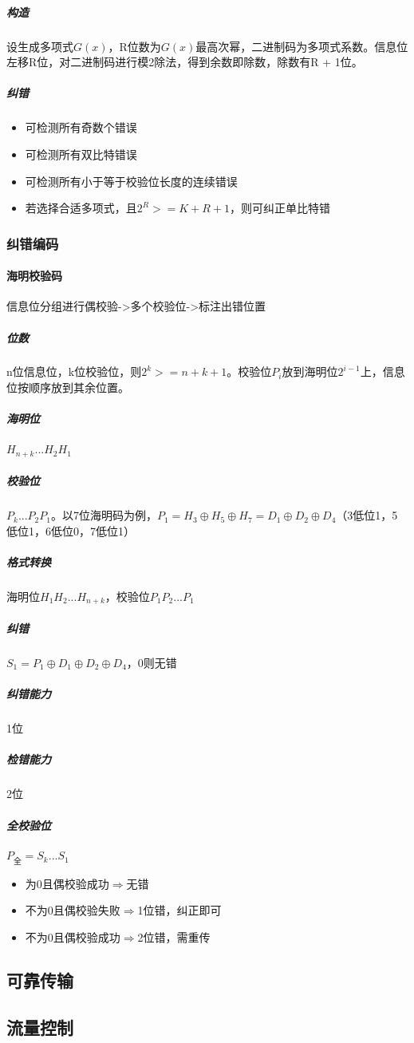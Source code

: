 \subparagraph{构造}
设生成多项式\(G(x)\)，R位数为\(G(x)\)最高次幂，二进制码为多项式系数。信息位左移R位，对二进制码进行模2除法，得到余数即除数，除数有R + 1位。

\subparagraph{纠错}
\begin{itemize}
    \item 可检测所有奇数个错误
    \item 可检测所有双比特错误
    \item 可检测所有小于等于校验位长度的连续错误
    \item 若选择合适多项式，且\(2^R >= K + R + 1\)，则可纠正单比特错
\end{itemize}


\subsubsection{纠错编码}

\paragraph{海明校验码}
信息位分组进行偶校验->多个校验位->标注出错位置
\subparagraph{位数}
n位信息位，k位校验位，则\(2^k >= n + k + 1\)。校验位\(P_i\)放到海明位\(2^{i - 1}\)上，信息位按顺序放到其余位置。
\subparagraph{海明位}
\(H_{n + k} ...H_2 H_1\)
\subparagraph{校验位}
\(P_k...P_2P_1\)。以7位海明码为例，\(P_1 = H_3 \oplus H_5 \oplus H_7 = D_1 \oplus D_2 \oplus D_4\)（3低位1，5低位1，6低位0，7低位1）
\subparagraph{格式转换}
海明位\(H_1H_2...H_{n + k}\)，校验位\(P_1P_2...P_1\)
\subparagraph{纠错}
\(S_1 = P_1 \oplus D_1 \oplus D_2 \oplus D_4\)，0则无错
\subparagraph{纠错能力}
1位
\subparagraph{检错能力}
2位
\subparagraph{全校验位}
\(P_{\text{全}} = S_k...S_1\)\begin{itemize}
    \item 为0且偶校验成功\(\Rightarrow\)无错
    \item 不为0且偶校验失败\(\Rightarrow\)1位错，纠正即可
    \item 不为0且偶校验成功\(\Rightarrow\)2位错，需重传
\end{itemize}


\subsection{可靠传输}



\subsection{流量控制}


